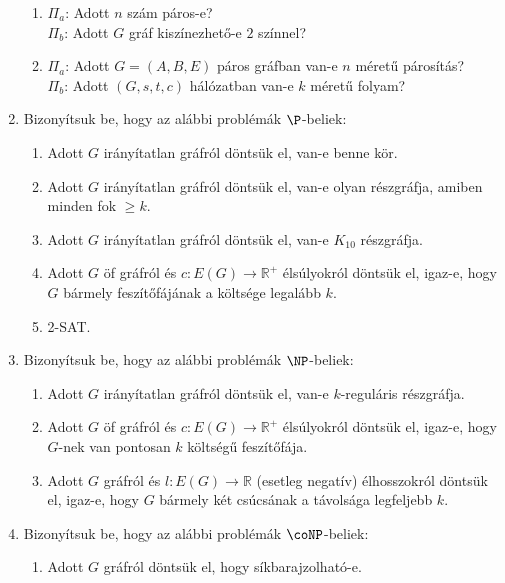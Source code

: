 \documentclass[a4paper, 12pt]{article}
\begin{document}
\begin{enumerate}
\begin{enumerate}
                \item $\Pi_a$: Adott $n$ szám páros-e? \\
                $\Pi_b$: Adott $G$ gráf kiszínezhető-e $2$ színnel?

                \item $\Pi_a$: Adott $G=(A,B,E)$ páros gráfban van-e $n$ méretű párosítás? \\
                $\Pi_b$: Adott $(G, s, t, c)$ hálózatban van-e $k$ méretű folyam?
            \end{enumerate}
            \item Bizonyítsuk be, hogy az alábbi problémák $\P$-beliek:
            \begin{enumerate}
                \item Adott $G$ irányítatlan gráfról döntsük el, van-e benne kör.
                \item Adott $G$ irányítatlan gráfról döntsük el, van-e olyan részgráfja, amiben minden fok $\geq k$.
                \item Adott $G$ irányítatlan gráfról döntsük el, van-e $K_{10}$ részgráfja.
                \item Adott $G$ öf gráfról és $c:E(G)\rightarrow \mathbb{R}^{+}$ élsúlyokról döntsük el, igaz-e, hogy $G$ bármely feszítőfájának a költsége legalább $k$.
                \item 2-SAT.
            \end{enumerate}
            \item Bizonyítsuk be, hogy az alábbi problémák $\NP$-beliek:
            \begin{enumerate}
                \item Adott $G$ irányítatlan gráfról döntsük el, van-e $k$-reguláris részgráfja.
                \item Adott $G$ öf gráfról és $c:E(G)\rightarrow\mathbb{R}^{+}$ élsúlyokról döntsük el, igaz-e, hogy $G$-nek van pontosan $k$ költségű feszítőfája.
                \item Adott $G$ gráfról és $l:E(G)\rightarrow\mathbb{R}$ (esetleg negatív) élhosszokról döntsük el, igaz-e, hogy $G$ bármely két csúcsának a távolsága legfeljebb $k$.
            \end{enumerate}
            \item Bizonyítsuk be, hogy az alábbi problémák $\coNP$-beliek:
            \begin{enumerate}
                \item Adott $G$ gráfról döntsük el, hogy síkbarajzolható-e.

\end{enumerate}
\end{enumerate}
\end{document}
